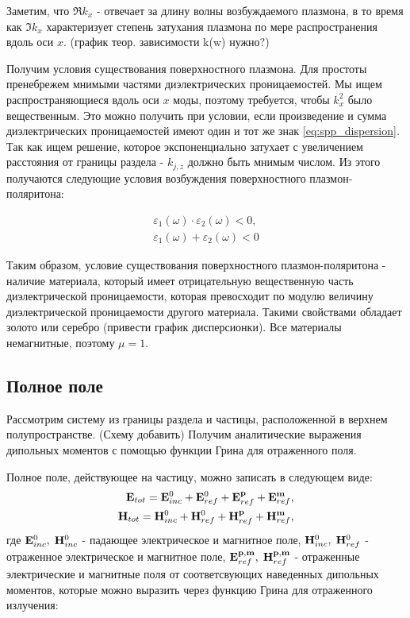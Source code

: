 Заметим, что $\Re{k_x}$ - отвечает за длину волны возбуждаемого плазмона, в то время как $\Im{k_x}$ характеризует степень затухания плазмона по мере распространения вдоль оси $x$.
(график теор. зависимости k(w) нужно?)

Получим условия существования поверхностного плазмона. Для простоты пренебрежем мнимыми частями диэлектрических проницаемостей.  Мы ищем распространяющиеся вдоль оси $x$ моды, поэтому требуется, чтобы $k_x^2$ было вещественным. Это можно получить при условии, если произведение и сумма диэлектрических проницаемостей имеют один и тот же знак \eqref{eq:spp_dispersion}. Так как ищем решение, которое экспоненциально затухает с увеличением расстояния от границы раздела - $k_{j,z}$ должно быть мнимым числом. Из этого получаются следующие условия возбуждения поверхностного плазмон-поляритона:

\begin{equation}
    \begin{aligned}
        \varepsilon_1(\omega) \cdot \varepsilon_2(\omega) < 0,\\
        \varepsilon_1(\omega) + \varepsilon_2(\omega) <0
    \end{aligned}
\end{equation}

Таким образом, условие существования поверхностного плазмон-поляритона - наличие материала, который имеет отрицательную вещественную часть диэлектрической проницаемости, которая превосходит по модулю величину диэлектрической проницаемости другого материала. Такими свойствами обладает золото или серебро (привести график дисперсионки). Все материалы немагнитные, поэтому $\mu=1$.

\subsection{Полное поле}\label{subsec:full_field}

Рассмотрим систему из границы раздела и частицы, расположенной в верхнем полупространстве. (Схему добавить) Получим аналитические выражения дипольных моментов с помощью функции Грина для отраженного поля. 

Полное поле, действующее на частицу, можно записать в следующем виде:
\begin{equation}
    \begin{aligned}
        \vb{E}_{tot} = \vb{E}^0_{inc} + \vb{E}^0_{ref} + \vb{E}^{\vb{p}}_{ref}+\vb{E}^{\vb{m}}_{ref},\\
        \vb{H}_{tot} = \vb{H}^0_{inc} + \vb{H}^0_{ref} + \vb{H}^{\vb{p}}_{ref}+\vb{H}^{\vb{m}}_{ref},
    \end{aligned}
\end{equation}
где $\vb{E}^0_{inc},\;\vb{H}^0_{inc}$ - падающее электрическое и магнитное поле, $\vb{H}^0_{inc},\; \vb{H}^0_{ref}$ - отраженное электрическое и магнитное поле, $\vb{E}^{\vb{p},\vb{m}}_{ref},\;\vb{H}^{\vb{p},\vb{m}}_{ref}$ - отраженные электрические и магнитные поля от соответсвующих наведенных дипольных моментов, которые можно выразить через функцию Грина для отраженного излучения:

